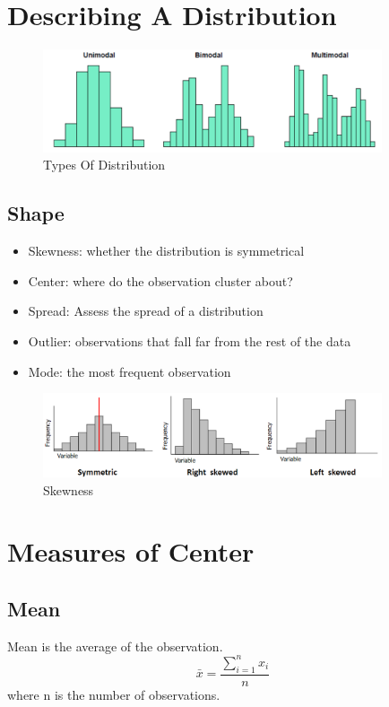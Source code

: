\documentclass{article}
\begin{document}
    \section*{Describing A Distribution}
    \begin{figure}[H]
        \centering
        \includegraphics[width=10cm]{figures/types_of_distribution.PNG}
        \caption{Types Of Distribution}
        \label{fig:types_of_distribution}
    \end{figure}

    \subsection*{Shape}
    \begin{itemize}
        \item Skewness: whether the distribution is symmetrical
        \item Center: where do the observation cluster about?
        \item Spread: Assess the spread of a distribution
        \item Outlier: observations that fall far from the rest of the data
        \item Mode: the most frequent observation
    \end{itemize}

    \begin{figure}[H]
        \centering
        \includegraphics[width=10cm]{figures/Skewness.PNG}
        \caption{Skewness}
        \label{fig:skewness}
    \end{figure}

    \section*{Measures of Center}
    \subsection*{Mean}
    Mean is the average of the observation.
    \begin{equation*}
        \bar{x} = \frac{\sum_{i = 1}^{n} x_{i}}{n}
    \end{equation*}
    where n is the number of observations.
\end{document}
